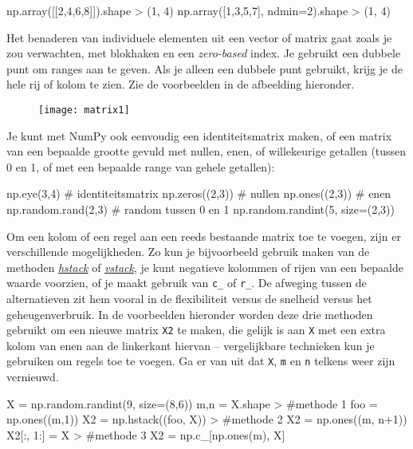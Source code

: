 \begin{python}
np.array([[2,4,6,8]]).shape
> (1, 4)
np.array([1,3,5,7], ndmin=2).shape
> (1, 4)
\end{python}

Het benaderen van individuele elementen uit een vector of matrix gaat zoals je zou verwachten, met blokhaken en een \textit{zero-based} index. Je gebruikt een dubbele punt om ranges aan te geven. Als je alleen een dubbele punt gebruikt, krijg je de hele rij of kolom te zien. Zie de voorbeelden in de afbeelding hieronder. 

\begin{figure}[h]
\texttt{[image: matrix1]}
\centering
\end{figure}

Je kunt met NumPy ook eenvoudig een identiteitsmatrix maken, of een matrix van een bepaalde grootte gevuld met nullen, enen, of willekeurige getallen (tussen 0 en 1, of met een bepaalde range van gehele getallen):

\begin{python}
np.eye(3,4)         # identiteitsmatrix
np.zeros((2,3))     # nullen
np.ones((2,3))      # enen
np.random.rand(2,3) # random tussen 0 en 1
np.random.randint(5, size=(2,3))
\end{python}

Om een kolom of een regel aan een reeds bestaande matrix toe te voegen, zijn er verschillende mogelijkheden. Zo kun je bijvoorbeeld gebruik maken van de methoden \textit{\href{https://docs.scipy.org/doc/numpy/reference/generated/numpy.hstack.html}{hstack}} of \textit{\href{https://docs.scipy.org/doc/numpy/reference/generated/numpy.vstack.html}{vstack}}, je kunt negatieve kolommen of rijen van een bepaalde waarde voorzien, of je maakt gebruik van \texttt{c\_} of \texttt{r\_}. De afweging tussen de alternatieven zit hem vooral in de flexibiliteit versus de snelheid versus het geheugenverbruik. In de voorbeelden hieronder worden deze drie methoden gebruikt om een nieuwe matrix \texttt{X2} te maken, die gelijk is aan \texttt{X} met een extra kolom van enen aan de linkerkant hiervan – vergelijkbare technieken kun je gebruiken om regels toe te voegen. Ga er van uit dat \texttt{X}, \texttt{m} en \texttt{n} telkens weer zijn vernieuwd.


\begin{python}
X = np.random.randint(9, size=(8,6))
m,n = X.shape
>
#methode 1
foo = np.ones((m,1))
X2 = np.hstack((foo, X))
>
#methode 2
X2 = np.ones((m, n+1))
X2[:, 1:] = X
>
#methode 3
X2 = np.c_[np.ones(m), X]
\end{python}



